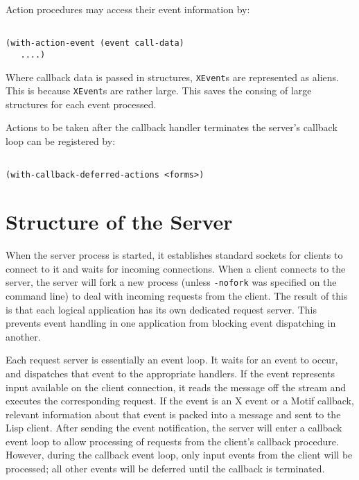 \documentclass{article}
\begin{document}
\noindent
Action procedures may access their event information by:

\begin{verbatim}

(with-action-event (event call-data)
   ....)

\end{verbatim}

\noindent
Where callback data is passed in structures, \texttt{XEvent}s are represented
as aliens.  This is because \texttt{XEvent}s are rather large.  This saves the
consing of large structures for each event processed.

Actions to be taken after the callback handler terminates the server's
callback loop can be registered by:

\begin{verbatim}

(with-callback-deferred-actions <forms>)

\end{verbatim}


\section{Structure of the Server}


When the server process is started, it establishes standard sockets
for clients to connect to it and waits for incoming connections.  When
a client connects to the server, the server will fork a new process
(unless \texttt{-nofork} was specified on the command line) to deal
with incoming requests from the client.  The result of this is that
each logical application has its own dedicated request server.  This
prevents event handling in one application from blocking event
dispatching in another.

Each request server is essentially an event loop.  It waits for an
event to occur, and dispatches that event to the appropriate handlers.
If the event represents input available on the client connection, it
reads the message off the stream and executes the corresponding
request.  If the event is an X event or a Motif callback, relevant
information about that event is packed into a message and sent to the
Lisp client.  After sending the event notification, the server will
enter a callback event loop to allow processing of requests from the
client's callback procedure.  However, during the callback event loop,
only input events from the client will be processed; all other events
will be deferred until the callback is terminated.
\end{document}

